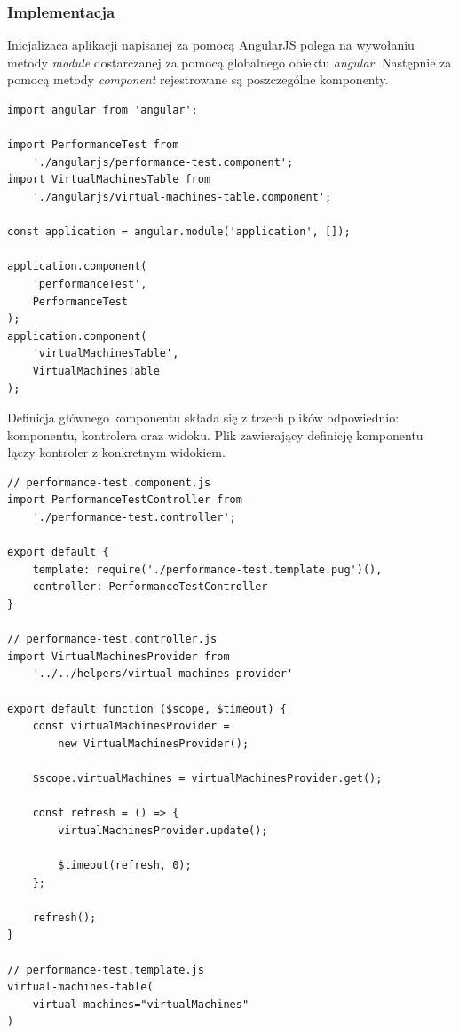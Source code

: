 \documentclass[polish, twoside, 12pt]{mwart}
\begin{document}
\subsubsection{Implementacja}

Inicjalizaca aplikacji napisanej za pomocą AngularJS polega na wywołaniu metody \emph{module} dostarczanej za pomocą globalnego obiektu \emph{angular}. Następnie za pomocą metody \emph{component} rejestrowane są poszczególne komponenty.

\begin{lstlisting}[caption=Inicjalizacja głównego modułu oraz rejestracja komponentów]
import angular from 'angular';

import PerformanceTest from
    './angularjs/performance-test.component';
import VirtualMachinesTable from
    './angularjs/virtual-machines-table.component';

const application = angular.module('application', []);

application.component(
    'performanceTest',
    PerformanceTest
);
application.component(
    'virtualMachinesTable',
    VirtualMachinesTable
);
\end{lstlisting}

Definicja głównego komponentu składa się z trzech plików odpowiednio: komponentu, kontrolera oraz widoku. Plik zawierający definicję komponentu łączy kontroler z konkretnym widokiem.

\begin{lstlisting}[caption=Główny komponent]
// performance-test.component.js
import PerformanceTestController from
    './performance-test.controller';

export default {
    template: require('./performance-test.template.pug')(),
    controller: PerformanceTestController
}

// performance-test.controller.js
import VirtualMachinesProvider from
    '../../helpers/virtual-machines-provider'

export default function ($scope, $timeout) {
    const virtualMachinesProvider =
        new VirtualMachinesProvider();
    
    $scope.virtualMachines = virtualMachinesProvider.get();
    
    const refresh = () => {
        virtualMachinesProvider.update();

        $timeout(refresh, 0);
    };

    refresh();
}

// performance-test.template.js
virtual-machines-table(
    virtual-machines="virtualMachines"
)
\end{lstlisting}
\end{document}
